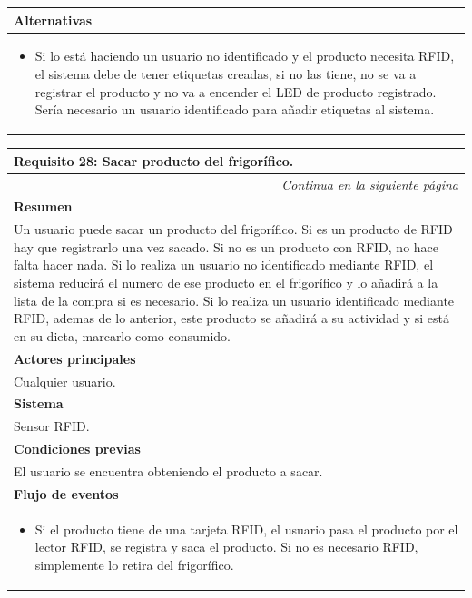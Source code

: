\begin{longtable}{|p{}|}
     \hline
     \rowcolor[gray]{.9}
     \textbf{Alternativas}  \\
     \hline
      \begin{itemize}
         \item Si lo está haciendo un usuario no identificado y el producto necesita RFID, el sistema debe de tener etiquetas creadas, si no las tiene, no se va a registrar el producto y no va a encender el LED de producto registrado. Sería necesario un usuario identificado para añadir etiquetas al sistema.
     \end{itemize} \\
     \hline
\end{longtable}

\begin{longtable}{|p{}|}
\hline
 \rowcolor[gray]{.5}
 \color{white}\textbf{Requisito 28: Sacar producto del frigorífico.} \\
\hline
\endfirsthead
\endhead
\hline \multicolumn{1}{r}{\textit{Continua en la siguiente página}} \\
\endfoot
\endlastfoot
    \rowcolor[gray]{.9}
     \textbf{Resumen} \\
     \hline
     Un usuario puede sacar un producto del frigorífico. Si es un producto de RFID hay que registrarlo una vez sacado. Si no es un producto con RFID, no hace falta hacer nada. Si lo realiza un usuario no identificado mediante RFID, el sistema reducirá el numero de ese producto en el frigorífico y lo añadirá a la lista de la compra si es necesario. Si lo realiza un usuario identificado mediante RFID, ademas de lo anterior, este producto se añadirá a su actividad y si está en su dieta, marcarlo como consumido. \\
     \hline
     \rowcolor[gray]{.9}
     \textbf{Actores principales} \\
     \hline
     Cualquier usuario. \\
     \hline
     \rowcolor[gray]{.9}
     \textbf{Sistema} \\
     \hline
     Sensor RFID. \\
     \hline
     \rowcolor[gray]{.9}
     \textbf{Condiciones previas} \\
     \hline
     El usuario se encuentra obteniendo el producto a sacar. \\
     \hline
     \rowcolor[gray]{.9}
     \textbf{Flujo de eventos}  \\
     \hline
      \begin{itemize}
         \item Si el producto tiene de una tarjeta RFID, el usuario pasa el producto por el lector RFID, se registra y saca el producto. Si no es necesario RFID, simplemente lo retira del frigorífico.

\end{itemize}
\end{longtable}
